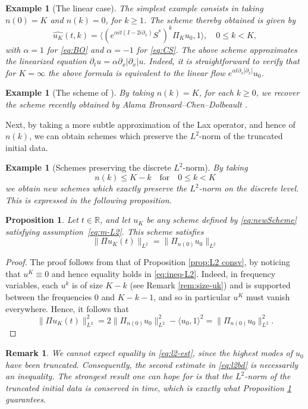 \documentclass [11pt] {article}
\newtheorem{prop}[thm]{Proposition}
\newtheorem{rem}[thm]{Remark}
\newtheorem{ex}[thm]{Example}
\newcommand{\<}{\langle}
\renewcommand{\>}{\rangle}
\begin{document}
\begin{ex}[The linear case]
The simplest example consists in taking $n(0)=K$ and $n(k) = 0$, for  $k\ge 1$. The scheme thereby obtained is given by
\begin{equation}\label{eq:linscheme}
\widehat{u_{K}}(t,k) = \langle (e^{\alpha it(I-2i\partial_x)}S^*)^k\Pi_{K}u_0, 1\rangle, \quad 0\le k < K,
\end{equation}
with $\alpha = 1$ for \eqref{eq:BO} and $\alpha = -1$ for \eqref{eq:CS}.
The above scheme approximates the linearized equation
$
\partial_t u = \alpha \partial_x |\partial_x| u.
$
Indeed, it is straightforward to verify that for $K=\infty$ the above formula is equivalent to the linear flow $e^{\alpha t\partial_x|\partial_x|} u_0$.
\end{ex}

\begin{ex}[The scheme of \cite{ABCD24}] By taking $n(k)= K$, for each $k\ge 0$, we recover the scheme recently obtained by Alama Bronsard--Chen--Dolbeault \cite{ABCD24}.
\end{ex}
%
Next, by taking a more subtle approximation of the Lax operator, and hence of $n(k)$, we can obtain schemes which preserve the $L^2$-norm of the truncated initial data.
%
\begin{ex}[Schemes preserving the discrete $L^2$-norm]
By taking 
\begin{equation}\label{eq:m-L2}
n(k) \le K-k \quad \text{for} \quad 0\le k< K
\end{equation}
we obtain new schemes which {\it exactly preserve} the $L^2$-norm on the discrete level. This is expressed in the following proposition. 
\end{ex}
\begin{prop}\label{prop:l2norm-pres}
Let $t\in\mathbb{R}$, and let $u_K$ be any scheme defined by \eqref{eq:newScheme} satisfying assumption~\eqref{eq:m-L2}. This scheme satisfies
\[
\|\Pi u_{K}(t)\|_{L^2} =  \| \Pi_{n(0)} u_0\|_{L^2}
\]
\end{prop}
\begin{proof}
The proof follows from that of Proposition \ref{prop:L2 consv}, by noticing that $u^K \equiv 0$ and hence equality holds in \eqref{eq:ineq-L2}.  Indeed, in frequency variables, each $u^k$ is of size $K-k$ (see Remark \ref{rem:size-uk}) and is supported between the frequencies $0$ and $K-k-1$, and so in particular $u^K$ must vanish everywhere. Hence, it follows that
\[
\| \Pi u_K(t)\|_{L^2}^2 = 2 \| \Pi_{n(0)}u_0\|_{L^2}^2 - \langle u_0, 1 \rangle^2 = \| \Pi_{n(0)} u_0\|_{L^2}^2.
\]
\end{proof}
\begin{rem}
We cannot expect equality in \eqref{eq:l2-est}, since the highest modes of $u_0$ have been truncated. Consequently, the second estimate in \eqref{eq:l2bd} is necessarily an inequality. The strongest result one can hope for is that the $L^2$-norm of the truncated initial data is conserved in time, which is exactly what Proposition \ref{prop:l2norm-pres} guarantees.
\end{rem}
\end{document}
